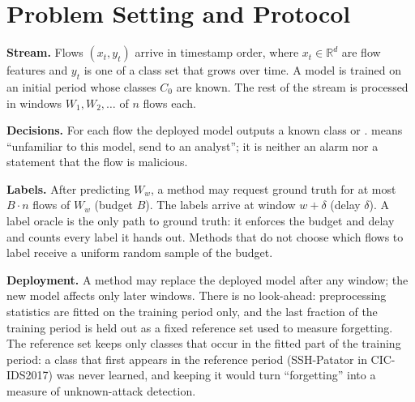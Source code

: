 \section{Problem Setting and Protocol}
\label{sec:problem}

\textbf{Stream.} Flows $(x_t, y_t)$ arrive in timestamp order, where $x_t \in \mathbb{R}^d$ are flow features and
$y_t$ is one of a class set that grows over time. A model is trained on an initial period whose classes $C_0$
are known. The rest of the stream is processed in windows $W_1, W_2, \dots$ of $n$ flows each.

\textbf{Decisions.} For each flow the deployed model outputs a known class or \unk{}. \unk{} means
``unfamiliar to this model, send to an analyst''; it is neither an alarm nor a statement that the flow is
malicious.

\textbf{Labels.} After predicting $W_w$, a method may request ground truth for at most $B\cdot n$ flows of
$W_w$ (budget $B$). The labels arrive at window $w+\delta$ (delay $\delta$). A label oracle is the only
path to ground truth: it enforces the budget and delay and counts every label it hands out. Methods that do
not choose which flows to label receive a uniform random sample of the budget.

\textbf{Deployment.} A method may replace the deployed model after any window; the new model affects only later
windows. There is no look-ahead: preprocessing statistics are fitted on the training period only, and the last
fraction of the training period is held out as a fixed reference set used to measure forgetting. The reference
set keeps only classes that occur in the fitted part of the training period: a class that first appears in the
reference period (SSH-Patator in CIC-IDS2017) was never learned, and keeping it would turn ``forgetting'' into a
measure of unknown-attack detection.

